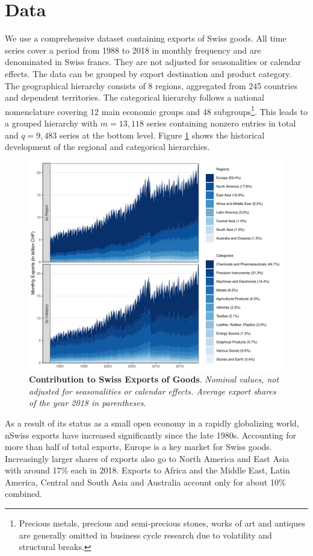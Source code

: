 \documentclass[a4paper,fleqn,11pt]{article}
\begin{document}
\section{Data}
We use a comprehensive dataset containing exports of Swiss goods. All time series cover a period from 1988 to 2018 in monthly frequency and are denominated in Swiss francs. They are not adjusted for seasonalities or calendar effects. The data can be grouped by export destination and product category. The geographical hierarchy consists of 8 regions, aggregated from 245 countries and dependent territories. The categorical hierarchy follows a national nomenclature covering 12 main economic groups and 48 subgroups\footnote{Precious metals, precious and semi-precious stones, works of art and antiques are generally omitted in business cycle research due to volatility and structural breaks.}. This leads to a grouped hierarchy with $m = 13,118$ series containing nonzero entries in total and $q = 9,483$ series at the bottom level. Figure \ref{fig:area} shows the historical development of the regional and categorical hierarchies.
\begin{figure}[H]
	\includegraphics[width=\textwidth]{fig/fig_area}
	\caption[Contribution to Swiss Exports of Goods]{\small{\textbf{Contribution to Swiss Exports of Goods}. \textit{Nominal values, not adjusted for seasonalities or calendar effects. Average export shares of the year 2018 in parentheses.}}}\label{fig:area}
\end{figure}
As a result of its status as a small open economy in a rapidly globalizing world, nSwiss exports have increased significantly since the late 1980s. Accounting for more than half of total exports, Europe is a key market for Swiss goods. Increasingly larger shares of exports also go to North America and East Asia with around 17\% each in 2018. Exports to Africa and the Middle East, Latin America, Central and South Asia and Australia account only for about 10\% combined.
\end{document}
